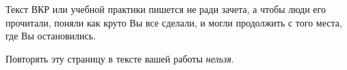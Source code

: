 \documentclass[14pt, russian]{matmex-diploma-custom}
\begin{document}

\maketitle
\setcounter{tocdepth}{2}
\tableofcontents


\pagebreak
\newfontfamily{}
\begin{center}
  \hspace{0pt}
  \vfill
  {\Huge\myfont
    Текст ВКР или учебной практики пишется не ради зачета, а чтобы люди его прочитали, поняли как круто Вы все сделали, и могли продолжить с того места, где Вы остановились.
  \vspace{2em}

  Повторять эту страницу в тексте вашей работы \emph{нельзя}.}
  \vfill
  \hspace{0pt}
\end{center}
\pagebreak












\setmonofont{CMU Typewriter Text}


\end{document}
